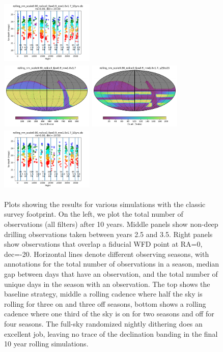 \documentclass[modern]{aastex62}
\begin{document}
\begin{figure}
\includegraphics[height=1.25in, width=1.75in]{plots/rolling_nm_scale090_nslice2_fpw09_nrw10v17_spotc.pdf}\\
\includegraphics[height=1.25in, width=1.75in]{plots/rolling_nm_scale0.90_nslice3_fpw0.9_nrw1.0v1.7/rolling_nm_scale0_90_nslice3_fpw0_9_nrw1_0v1_7_Count_HEAL_SkyMap.pdf}
\includegraphics[height=1.25in, width=1.75in]{plots/rolling_nm_scale0.90_nslice3_fpw0.9_nrw1.0v1.7/rolling_nm_scale0_90_nslice3_fpw0_9_nrw1_0v1_7_Count_night_gt_913_125000_and_night_lt_1278_375000_and_note_not_like_DD_HEAL_SkyMap.pdf}
\includegraphics[height=1.25in, width=1.75in]{plots/rolling_nm_scale090_nslice3_fpw09_nrw10v17_spotc.pdf}
\caption{Plots showing the results for various simulations with the classic survey footprint. On the left, we plot the total number of observations (all filters) after 10 years. Middle panels show non-deep drilling observations taken between years 2.5 and 3.5. Right panels show observations that overlap a fiducial WFD point at RA=0, dec=-20. Horizontal lines denote different observing seasons, with annotations for the total number of observations in a season, median gap between days that have an observation, and the total number of unique days in the season with an observation. The top shows the baseline strategy, middle a rolling cadence where half the sky is rolling for three on and three off seasons, bottom shows a rolling cadence where one third of the sky is on for two seasons and off for four seasons. The full-sky randomized nightly dithering does an excellent job, leaving no trace of the declination banding in the final 10 year rolling simulations. \label{fig:classics}}
\end{figure}
\end{document}
